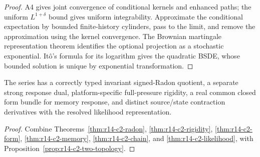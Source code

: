 \begin{proof}
A4 gives joint convergence of conditional kernels and enhanced paths; the
uniform \(L^{1+\delta}\) bound gives uniform integrability.  Approximate the
conditional expectation by bounded finite-history cylinders, pass to the
limit, and remove the approximation using the kernel convergence.  The
Brownian martingale representation theorem identifies the optional
projection as a stochastic exponential.  It\^o's formula for its logarithm
gives the quadratic BSDE, whose bounded solution is unique by exponential
transformation.
\end{proof}

\begin{theorem}
\label{thm:r14-c2-main}
The series has a correctly typed invariant signed-Radon quotient, a separate
strong response dual, platform-specific full-pressure rigidity, a real common
closed form bundle for memory response, and distinct source/state
contraction derivatives with the resolved likelihood representation.
\end{theorem}

\begin{proof}
Combine Theorems~\ref{thm:r14-c2-radon},
\ref{thm:r14-c2-rigidity}, \ref{thm:r14-c2-form},
\ref{thm:r14-c2-memory}, \ref{thm:r14-c2-chain}, and
\ref{thm:r14-c2-likelihood}, with
Proposition~\ref{prop:r14-c2-two-topology}.
\end{proof}
